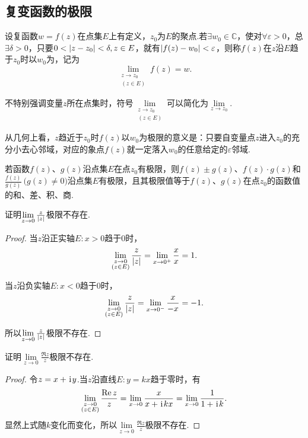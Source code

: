 \subsection{复变函数的极限}
\begin{definition}
设复函数\(w=f(z)\)在点集\(E\)上有定义，\(z_0\)为\(E\)的聚点.若\(\exists w_0 \in \mathbb{C}\)，使对\(\forall \varepsilon > 0\)，总\(\exists \delta > 0\)，只要\(0<\abs{z-z_0}<\delta, z \in E\)，就有\(\abs{f(z)-w_0} < \varepsilon\)，则称\(f(z)\)在\(z\)沿\(E\)趋于\(z_0\)时以\(w_0\)为，记为\[
\lim\limits_{\substack{z \to z_0 \\ (z \in E)}} f(z) = w.
\]

不特别强调变量\(z\)所在点集时，符号\(\lim\limits_{\substack{z \to z_0 \\ (z \in E)}}\)可以简化为\(\lim\limits_{z \to z_0}\).
\end{definition}
从几何上看，\(z\)趋近于\(z_0\)时\(f(z)\)以\(w_0\)为极限的意义是：只要自变量点\(z\)进入\(z_0\)的充分小去心邻域，对应的象点\(f(z)\)就一定落入\(w_0\)的任意给定的\(\varepsilon\)邻域.

\begin{theorem}
若函数\(f(z)\)、\(g(z)\)沿点集\(E\)在点\(z_0\)有极限，则\(f(z) \pm g(z)\)、\(f(z) \cdot g(z)\)和\(\frac{f(z)}{g(z)}\ \bigl(g(z) \neq 0\bigr)\)沿点集\(E\)有极限，且其极限值等于\(f(z)\)、\(g(z)\)在点\(z_0\)的函数值的和、差、积、商.
\end{theorem}

\begin{example}
证明\(\lim\limits_{z\to0} \frac{z}{\abs{z}}\)极限不存在.
\begin{proof}
当\(z\)沿正实轴\(E: x > 0\)趋于0时，\[
\lim\limits_{\substack{z\to0 \\ (z \in E)}} \frac{z}{\abs{z}}
= \lim\limits_{x\to0^+} \frac{x}{x} = 1.
\]

当\(z\)沿负实轴\(E: x < 0\)趋于0时，\[
\lim\limits_{\substack{z\to0 \\ (z \in E)}} \frac{z}{\abs{z}}
= \lim\limits_{x\to0^-} \frac{x}{-x} = -1.
\]

所以\(\lim\limits_{z\to0} \frac{z}{\abs{z}}\)极限不存在.
\end{proof}
\end{example}

\begin{example}
证明\(\lim\limits_{z\to0} \frac{\Re z}{z}\)极限不存在.
\begin{proof}
令\(z = x + \kern1pt\mathrm{i}\kern1pt y\).当\(z\)沿直线\(E: y = kx\)趋于零时，有\[
\lim\limits_{\substack{z\to0 \\ (z \in E)}} \frac{\Re z}{z}
= \lim\limits_{x\to0} \frac{x}{x + \kern1pt\mathrm{i}\kern1pt kx}
= \lim\limits_{x\to0} \frac{1}{1+\kern1pt\mathrm{i}\kern1pt k}.
\]显然上式随\(k\)变化而变化，所以\(\lim\limits_{z\to0} \frac{\Re z}{z}\)极限不存在.
\end{proof}
\end{example}

